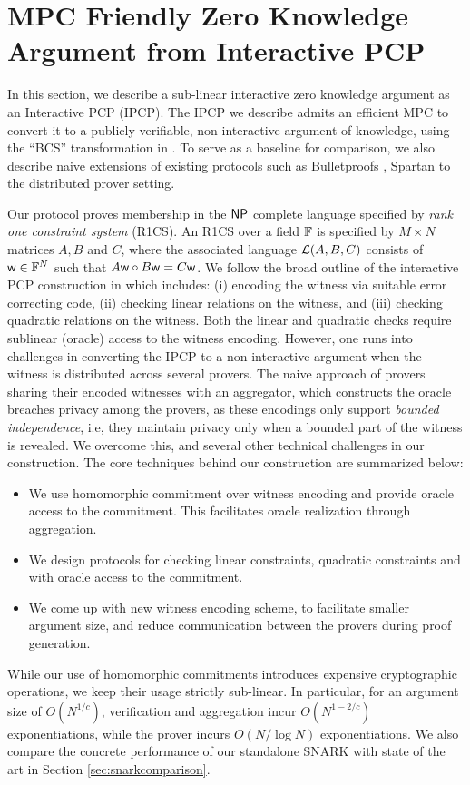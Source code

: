 \section{MPC Friendly Zero Knowledge Argument from Interactive PCP}
In this section, we describe a sub-linear interactive zero knowledge argument as
an Interactive PCP (IPCP). The IPCP we describe admits an efficient MPC to
convert it to a publicly-verifiable, non-interactive argument of knowledge,
using the ``BCS'' transformation in \cite{BCS16}. To serve as a
baseline for comparison, we also describe naive extensions of existing protocols
such as Bulletproofs \cite{bulletproofs}, Spartan \cite{spartan} to the
distributed prover setting. 

Our protocol proves membership in the $\mathsf{NP}$ complete
language specified by {\em rank one constraint system} (R1CS). An R1CS over a
field $\mathbb{F}$ is specified by $M\times N$ matrices $A,B$ and $C$, where the
associated language $\mathcal{L}(A,B,C)$ consists of $\mathsf{w}\in \mathbb{F}^N$ such that
$A\mathsf{w}\circ B\mathsf{w}=C\mathsf{w}$. We follow the broad outline of the interactive PCP
construction in \cite{ligero} which includes: (i) encoding the witness via suitable
error correcting code, (ii) checking linear relations on the witness, and 
(iii) checking quadratic relations on
the witness. Both the linear and quadratic checks require sublinear (oracle) access to the 
witness encoding.
However, one runs into 
challenges in converting the IPCP to a non-interactive
argument when the witness is distributed across several provers. The naive
approach of provers sharing their encoded witnesses with an aggregator, which
constructs the oracle breaches privacy among the provers, as these encodings
only support {\em bounded independence}, i.e, they maintain privacy only when a
bounded part of the witness is revealed. We overcome this, and several other
technical challenges in our construction. The core techniques behind our
construction are summarized below:
\begin{itemize}
\item We use homomorphic commitment over witness encoding and provide oracle
access to the commitment. This facilitates oracle realization through
aggregation.
\item We design protocols for checking linear constraints, quadratic constraints
and with oracle access to the commitment.
\item We come up with new witness encoding scheme, to facilitate smaller
argument size, and reduce communication between the provers during proof
generation.
\end{itemize}
While our use of homomorphic commitments introduces expensive cryptographic
operations, we keep their usage strictly sub-linear. In particular, for an
argument size of $O(N^{1/c})$, verification and aggregation incur $O(N^{1-2/c})$
exponentiations, while the prover incurs $O(N/\log N)$ exponentiations. We also
compare the concrete performance of our standalone SNARK with state of the art in Section
\ref{sec:snarkcomparison}.
